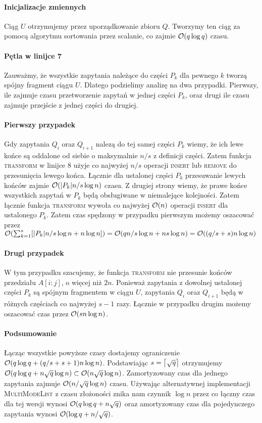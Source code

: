 \paragraph{Inicjalizacje zmiennych}
Ciąg $U$ otrzymujemy przez uporządkowanie zbioru $Q$. Tworzymy ten ciąg za pomocą algorytmu sortowania przez scalanie, co zajmie $\mathcal{O}(q \log q)$ czasu.
\paragraph{Pętla w linijce 7}
Zauważmy, że wszystkie zapytania należące do części $P_k$ dla pewnego $k$ tworzą spójny fragment ciągu $U$. Dlatego podzielimy analizę na dwa przypadki. Pierwszy, ile zajmuje czasu przetworzenie zapytań w jednej części $P_k$, oraz drugi ile czasu zajmuje przejście z jednej części do drugiej.

\paragraph{Pierwszy przypadek}
Gdy zapytania $Q_i$ oraz $Q_{i+1}$ nalezą do tej samej części $P_k$ wiemy, że ich lewe końce są oddalone od siebie o maksymalnie $n/s$ z definicji części. Zatem funkcja \textsc{transform} w linijce 8 użyje co najwyżej $n/s$ operacji \textsc{insert} lub \textsc{remove} do przesunięcia lewego końca. Łącznie dla ustalonej części $P_k$ przesuwanie lewych końców zajmie $\mathcal{O}(|P_k|n/s \log n)$ czasu. Z drugiej strony wiemy, że prawe końce wszystkich zapytań w $P_k$ będą obsługiwane  w niemalejące kolejności. Zatem łącznie funkcja \textsc{transform} wywoła co najwyżej $\mathcal{O}(n)$ operacji \textsc{insert} dla ustalonego $P_k$. Zatem czas spędzony w przypadku pierwszym możemy oszacować przez $\mathcal{O}(\sum_{k=1}^{s}[|P_k|n/s \log n + n \log n]) = \mathcal{O}(qn/s \log n + ns \log n) = \mathcal{O}((q/s+s)n \log n)$
\paragraph{Drugi przypadek}
W tym przypadku szacujemy, że funkcja \textsc{transform} nie przesunie końców przedziału $A[i:j]$, o więcej niż $2n$. Ponieważ zapytania z dowolnej ustalonej części $P_k$ są spójnym fragmentem w ciągu $U$, zapytania $Q_i$ oraz $Q_{i+1}$ będą w różnych częściach co najwyżej $s-1$ razy. Łącznie w przypadku drugim możemy oszacować czas przez $\mathcal{O}(sn\log n)$.
\paragraph{Podsumowanie}
Łącząc wszystkie powyższe czasy dostajemy ograniczenie $\mathcal{O}(q \log q + (q/s+s+1)n \log n)$. Podstawiając $s=\left\lceil\sqrt{q}\right\rceil$ otrzymujemy $\mathcal{O}(q \log q + n\sqrt{q}\log n) \subset \mathcal{O}(n\sqrt{q} \log n)$. Zamortyzowany czas dla jednego zapytania zajmuje $\mathcal{O}(n/\sqrt{q} \log n)$ czasu. Używając alternatywnej implementacji \textsc{MultiModeList} z czasu złożoności znika nam czynnik $\log n$ przez co łączny czas dla tej wersji wynosi $\mathcal{O}(q\log q + n\sqrt{q})$ oraz amortyzowany czas dla pojedynczego zapytania wynosi $\mathcal{O}(\log q + n / \sqrt{q})$.

